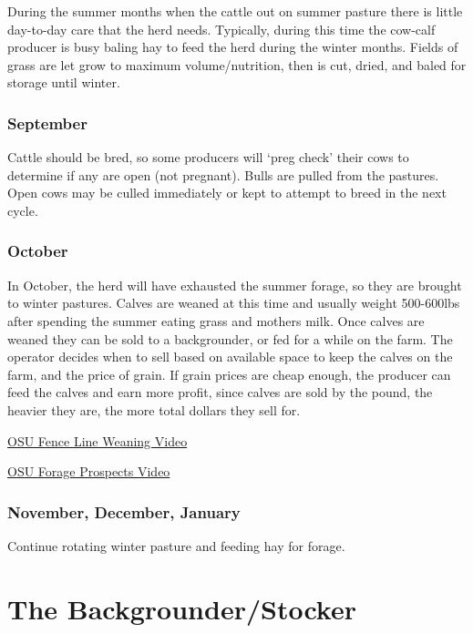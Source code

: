 \documentclass[]{book}
\theoremstyle{definition}
\theoremstyle{definition}
\theoremstyle{remark}
\begin{document}
During the summer months when the cattle out on summer pasture there is
little day-to-day care that the herd needs. Typically, during this time
the cow-calf producer is busy baling hay to feed the herd during the
winter months. Fields of grass are let grow to maximum volume/nutrition,
then is cut, dried, and baled for storage until winter.

\subsubsection{September}\label{september}

Cattle should be bred, so some producers will `preg check' their cows to
determine if any are open (not pregnant). Bulls are pulled from the
pastures. Open cows may be culled immediately or kept to attempt to
breed in the next cycle.

\subsubsection{October}\label{october}

In October, the herd will have exhausted the summer forage, so they are
brought to winter pastures. Calves are weaned at this time and usually
weight 500-600lbs after spending the summer eating grass and mothers
milk. Once calves are weaned they can be sold to a backgrounder, or fed
for a while on the farm. The operator decides when to sell based on
available space to keep the calves on the farm, and the price of grain.
If grain prices are cheap enough, the producer can feed the calves and
earn more profit, since calves are sold by the pound, the heavier they
are, the more total dollars they sell for.

\href{https://www.youtube.com/watch?v=qpGuOOA-fYU}{OSU Fence Line
Weaning Video}

\href{https://www.youtube.com/watch?v=JyvTl9PVdMQ\#action=share}{OSU
Forage Prospects Video}

\subsubsection{November, December,
January}\label{november-december-january}

Continue rotating winter pasture and feeding hay for forage.

\section{The Backgrounder/Stocker}\label{the-backgrounderstocker}
\end{document}
